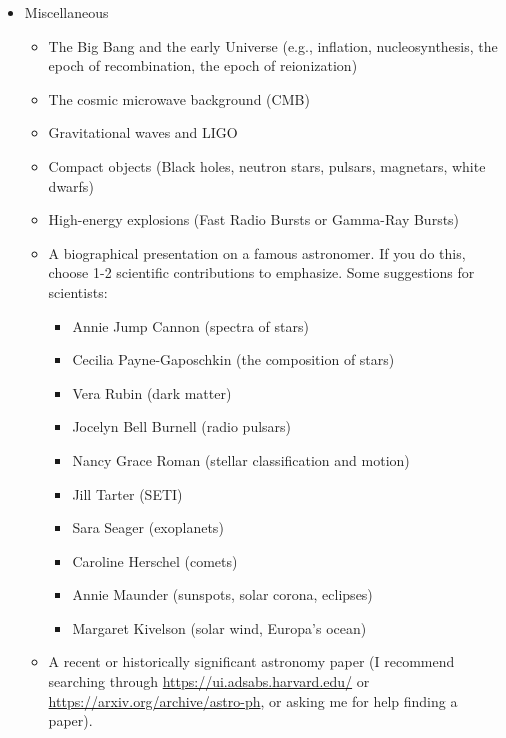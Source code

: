 \documentclass[11pt]{article}
\begin{document}
\begin{itemize}[noitemsep]
    \item Miscellaneous
        \begin{itemize}[noitemsep]
            \item The Big Bang and the early Universe (e.g., inflation, nucleosynthesis, the epoch of recombination, the epoch of reionization)
            \item The cosmic microwave background (CMB)
            \item Gravitational waves and LIGO
            \item Compact objects (Black holes, neutron stars, pulsars, magnetars, white dwarfs)
            \item High-energy explosions (Fast Radio Bursts or Gamma-Ray Bursts)
            \item A biographical presentation on a famous astronomer. If you do this, choose 1-2 scientific contributions to emphasize. Some suggestions for scientists:
            \begin{itemize}[noitemsep]
                \item Annie Jump Cannon (spectra of stars)
                \item Cecilia Payne-Gaposchkin (the composition of stars)
                \item Vera Rubin (dark matter)
                \item Jocelyn Bell Burnell (radio pulsars)
                \item Nancy Grace Roman (stellar classification and motion)
                \item Jill Tarter (SETI)
                \item Sara Seager (exoplanets)
                \item Caroline Herschel (comets)
                \item Annie Maunder (sunspots, solar corona, eclipses)
                \item Margaret Kivelson (solar wind, Europa’s ocean)
                
            \end{itemize}
            
            \item A recent or historically significant astronomy paper (I recommend searching through \url{https://ui.adsabs.harvard.edu/} or \url{https://arxiv.org/archive/astro-ph}, or asking me for help finding a paper).
            
            
            
        \end{itemize}
        
\end{itemize}
\end{document}
